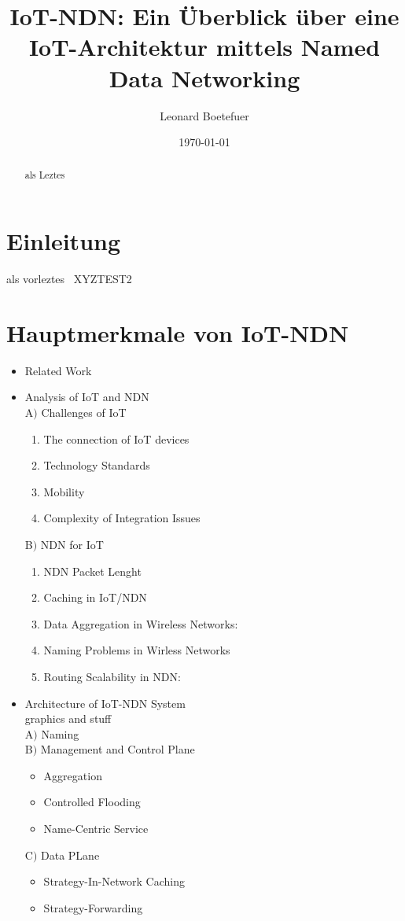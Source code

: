 \documentclass[a4paper,12pt]{article}
\title{IoT-NDN: Ein Überblick über eine IoT-Architektur mittels Named Data Networking}
\author{Leonard Boetefuer}
\date{\today}
\begin{document}
\maketitle

\begin{abstract}
als Leztes
\end{abstract}

\section{Einleitung}
als vorleztes
\
XYZTEST2
\section{Hauptmerkmale von IoT-NDN}
\begin{itemize}
\item Related Work
\item Analysis of IoT and NDN\\
    A$)$ Challenges of IoT\\
    \begin{enumerate}
        \item The connection of IoT devices
        \item Technology Standards
        \item Mobility
        \item Complexity of Integration Issues
    \end{enumerate}
    B$)$ NDN for IoT\\
    \begin{enumerate}
        \item NDN Packet Lenght
        \item Caching in IoT/NDN
        \item Data Aggregation in Wireless Networks:
        \item Naming Problems in Wirless Networks
        \item Routing Scalability in NDN:
    \end{enumerate}
\item Architecture of IoT-NDN System\\
    graphics and stuff\\
    A$)$ Naming\\
    B$)$ Management and Control Plane\\
    \begin{itemize}
        \item Aggregation
        \item Controlled Flooding
        \item Name-Centric Service
    \end{itemize}
    C$)$ Data PLane\\
    \begin{itemize}
        \item Strategy-In-Network Caching
        \item Strategy-Forwarding
    \end{itemize}
    
\end{itemize}
\end{document}
